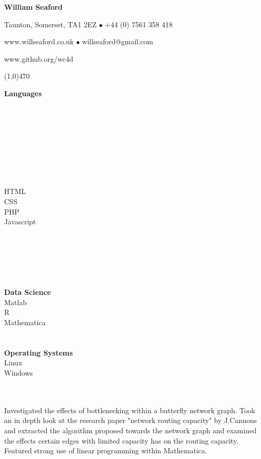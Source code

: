 \documentclass[11pt]{article}
\begin{document}
\centerline{\LARGE \bf William Seaford}					
\centerline{Taunton, Somerset, TA1 2EZ $\bullet$ +44 (0) 7561 358 418}
\centerline{www.willseaford.co.uk $\bullet$ willseaford@gmail.com}
\centerline{www.github.org/wc4d}
\noindent 												
\line(1,0){470}
\\
\begin{multicols}{3}
[
]
\textbf{Languages} \\
 \\
 \\
 \\
 \\ \\
 \\
 \\

\columnbreak
{} \\
HTML \\
CSS\\
PHP\\
Javascript\\ \\
 \\
 \\
\\ \\
\columnbreak \\
\textbf{Data Science} \\
Matlab \\
R \\
Mathematica \\ \\ \\
\textbf{Operating Systems} \\
Linux \\
Windows
\end{multicols}
  \\ \\
Investigated the effects of bottlenecking within a butterfly network graph. Took an in depth look at the research paper "network routing capacity" by J.Cannons and extracted the algorithm proposed towards the network graph and examined the effects certain edges with limited capacity has on the routing capacity. Featured strong use of linear programming within Mathematica. \\ \\
\end{document}

